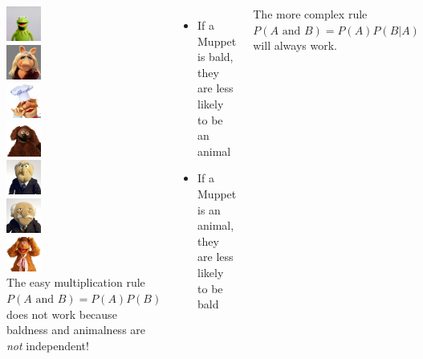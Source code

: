 \documentclass{beamer}\usepackage[]{graphicx}\usepackage[]{color}
\begin{document}
\begin{darkframes}
\begin{frame}
  \begin{columns}[onlytextwidth]
      \includegraphics[width=0.45in]{kermitthefrog} \\
      \includegraphics[width=0.45in]{misspiggy} \\
      \includegraphics[width=0.45in]{swedishchef} \\
      \includegraphics[width=0.45in]{rowlf} \\
      \includegraphics[width=0.45in]{statler} \\
      \includegraphics[width=0.45in]{waldorf} \\
      \includegraphics[width=0.45in]{fozziebear} \\
    The easy multiplication rule $P(\text{$A$ and $B$})=P(A)P(B)$ does not work because baldness and animalness are \emph{not} independent!
    \pause
    \begin{itemize}[<+->]
      \item If a Muppet is bald, they are less likely to be an animal
      \item If a Muppet is an animal, they are less likely to be bald
    \end{itemize}
    \pause
    The more complex rule $P(\text{$A$ and $B$})=P(A)P(B|A)$ will always work.
  \end{columns}
\end{frame}



\end{darkframes}
\end{document}
